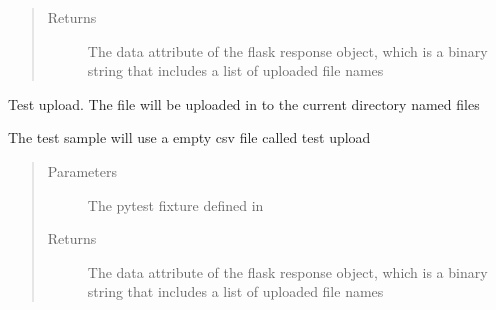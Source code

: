 \documentclass[letterpaper,10pt,english]{sphinxmanual}
\begin{document}
\begin{fulllineitems}
\begin{fulllineitems}
\begin{quote}
\begin{description}
\item[{Returns}] \leavevmode
The data attribute of the flask response object, which is a binary string that includes a list of uploaded
file names

\end{description}\end{quote}

\end{fulllineitems}


\begin{fulllineitems}
\label{\detokenize{tests:tests.test_cloudmesh.TestFileOperations.test_success_upload_sample}}
Test upload. The file will be uploaded in to the current directory named files

The test sample will use a empty csv file called test upload
\begin{quote}\begin{description}
\item[{Parameters}] \leavevmode
{} \textendash{} The pytest fixture defined in {\hyperref[\detokenize{tests:module-tests.conftest}]{}}

\item[{Returns}] \leavevmode
The data attribute of the flask response object, which is a binary string that includes a list of uploaded
file names

\end{description}\end{quote}

\end{fulllineitems}


\end{fulllineitems}

\end{document}
